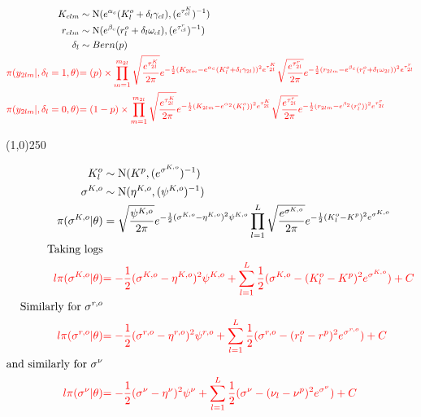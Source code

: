 \begin{align*}
K_{clm} &\sim \operatorname{N}(e^{\alpha_{c}}(K_{l}^o+\delta_{l}\gamma_{cl}),(e^{ \tau_{cl}^K })^{-1})\\
r_{clm} &\sim \operatorname{N}(e^{\beta_{c}}(r_{l}^o+\delta_{l}\omega_{cl}),(e^{ \tau_{cl}^r })^{-1})\\
\delta_{l} &\sim Bern(p)\\
\color{red}{
\pi(y_{2lm}|,\delta_{l}=1,\theta)}&
\color{red}{
=(p)\times
\prod_{m=1}^{m_{2l}}
\sqrt{\frac{e^{ \tau_{2l}^K }}{2\pi}} e^{-\frac{1}{2}(K_{2lm}-e^{\alpha_{c}}(K_{l}^o+\delta_{l}\gamma_{2l}))^{2}e^{ \tau_{2l}^K } }
\sqrt{\frac{e^{ \tau_{2l}^r }}{2\pi}} e^{-\frac{1}{2}(r_{2lm}-e^{\beta_{c}}(r_{l}^o+\delta_{l}\omega_{2l}))^{2}e^{ \tau_{2l}^r } }
}
\\
\color{red}{
\pi(y_{2lm}|,\delta_{l}=0,\theta)}&
\color{red}{
=(1-p)\times
\prod_{m=1}^{m_{2l}}
\sqrt{\frac{e^{ \tau_{2l}^K }}{2\pi}} e^{-\frac{1}{2}(K_{2lm}-e^{\alpha_{2}}(K_{l}^o))^{2}e^{ \tau_{2l}^K } }
\sqrt{\frac{e^{ \tau_{2l}^r }}{2\pi}} e^{-\frac{1}{2}(r_{2lm}-e^{\beta_{2}}(r_{l}^o))^{2}e^{ \tau_{2l}^r } }
}
\end{align*}

\begin{center}
\line(1,0){250}
\end{center}

\begin{align*}
K_{l}^o &\sim \operatorname{N}(K^p, (e^{ \sigma^{K,o} })^{-1} )\\
\sigma^{K,o} &\sim \operatorname{N}(\eta^{K,o}, (\psi^{K,o})^{-1} )\\
\pi(\sigma^{K,o} |\theta)&=
\sqrt{\frac{\psi^{K,o}}{2\pi}} e^{-\frac{1}{2}(\sigma^{K,o}-\eta^{K,o})^{2}\psi^{K,o} }
\prod_{l=1}^{L}
\sqrt{\frac{
e^{ \sigma^{K,o}}
}{2\pi}} e^{-\frac{1}{2}(
K_{l}^o-K^p
)^{2} 
e^{ \sigma^{K,o}}
}\\
\text{Taking logs}\\
\color{red}{l\pi(\sigma^{K,o}|\theta)}&
\color{red}{
=-\frac{1}{2}(\sigma^{K,o}-\eta^{K,o})^{2}\psi^{K,o} 
+
\sum_{l=1}^{L}\frac{1}{2}(\sigma^{K,o}-(K_{l}^o-K^p)^{2}e^{\sigma^{K,o}})
+C
}
\\
\text{Similarly for $\sigma^{r,o}$}\\
\color{red}{l\pi(\sigma^{r,o}|\theta)}&
\color{red}{
=-\frac{1}{2}(\sigma^{r,o}-\eta^{r,o})^{2}\psi^{r,o} 
+
\sum_{l=1}^{L}\frac{1}{2}(\sigma^{r,o}-(r_{l}^o-r^p)^{2}e^{\sigma^{r,o}})
+C
}
\\
\text{and similarly for $\sigma^{\nu}$}\\
\color{red}{l\pi(\sigma^{\nu}|\theta)}&
\color{red}{
=-\frac{1}{2}(\sigma^{\nu}-\eta^{\nu})^{2}\psi^{\nu} 
+
\sum_{l=1}^{L}\frac{1}{2}(\sigma^{\nu}-(\nu_{l}-\nu^p)^{2}e^{\sigma^{\nu}})
+C
}
\end{align*}